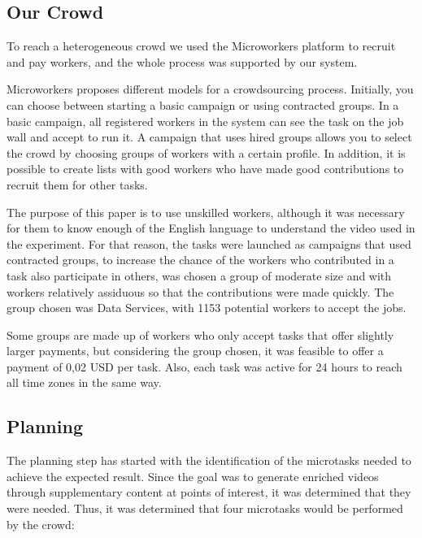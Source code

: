 \subsection{Our Crowd}
To reach a heterogeneous crowd we used the Microworkers platform to recruit and pay workers, and the whole process was supported by our system.

Microworkers proposes different models for a crowdsourcing process. Initially, you can choose between starting a basic campaign or using contracted groups. In a basic campaign, all registered workers in the system can see the task on the job wall and accept to run it. A campaign that uses hired groups allows you to select the crowd by choosing groups of workers with a certain profile. In addition, it is possible to create lists with good workers who have made good contributions to recruit them for other tasks. 

The purpose of this paper is to use unskilled workers, although it was necessary for them to know enough of the English language to understand the video used in the experiment. For that reason, the tasks were launched as campaigns that used contracted groups, to increase the chance of the workers who contributed in a task also participate in others, was chosen a group of moderate size and with workers relatively assiduous so that the contributions were made quickly. The group chosen was Data Services, with 1153 potential workers to accept the jobs.

Some groups are made up of workers who only accept tasks that offer slightly larger payments, but considering the group chosen, it was feasible to offer a payment of 0,02 USD per task. Also, each task was active for 24 hours to reach all time zones in the same way.


\subsection{Planning}

The planning step has started with the identification of the microtasks needed to achieve the expected result. Since the goal was to generate enriched videos through supplementary content at points of interest, it was determined that they were needed. Thus, it was determined that four microtasks would be performed by the crowd:

